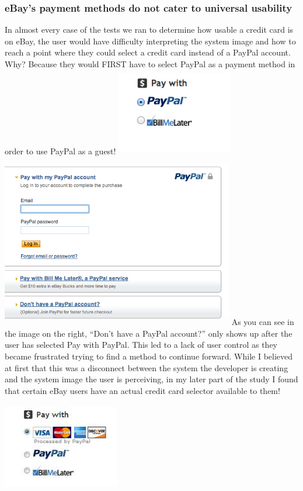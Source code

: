 \documentclass[11pt, oneside]{article}   	%
\begin{document}
\subsubsection{eBay's payment methods do not cater to universal usability}
In almost every case of the tests we ran to determine how usable a credit card is on eBay, the user would have difficulty interpreting the system image and how to reach a point where they could select a credit card instead of a PayPal account. Why? Because they would FIRST have to select PayPal as a payment method in order to use PayPal as a guest!
\includegraphics[width=2in, height=1.5in]{eBay2}
\includegraphics[width=4in, height=3in]{eBay3}
As you can see in the image on the right, ``Don't have a PayPal account?'' only shows up after the user has selected Pay with PayPal. This led to a lack of user control as they became frustrated trying to find a method to continue forward. While I believed at first that this was a disconnect between the system the developer is creating and the system image the user is perceiving, in my later part of the study I found that certain eBay users have an actual credit card selector available to them!

\includegraphics[width=2in, height=1.5in]{eBay4} 
\end{document}
